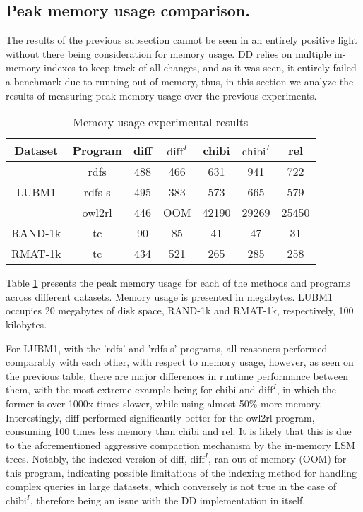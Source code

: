 \documentclass[sigconf,screen,review=false,natbib]{acmart}
\theoremstyle{definition}
\begin{document}
\subsection{Peak memory usage comparison.}
The results of the previous subsection cannot be seen in an entirely positive light without there being consideration for memory usage. DD relies on multiple
in-memory indexes to keep track of all changes, and as it was seen, it entirely failed a benchmark due to running out of memory, thus, in this section we analyze the results of
measuring peak memory usage over the previous experiments.
\begin{table}
	\caption{Memory usage experimental results}
	\begin{center}
		\begin{tabular}{|c|c|c|c|c|c|c|}
			\hline
			Dataset                & Program & diff & $\text{diff}^{I}$ & chibi & $\text{chibi}^{I}$ & rel   \\
			\hline
			\multirow{3}{*}{LUBM1} & rdfs    & 488  & 466               & 631   & 941                & 722   \\
			                       & rdfs-s  & 495  & 383               & 573   & 665                & 579   \\
			                       & owl2rl  & 446  & OOM               & 42190 & 29269              & 25450 \\
			\cline{2-7}
			\hline
			RAND-1k                & tc      & 90   & 85                & 41    & 47                 & 31    \\
			\hline
			RMAT-1k                & tc      & 434  & 521               & 265   & 285                & 258   \\
			\hline
		\end{tabular}
	\end{center}
	\label{tab:memorybenchmark}
\end{table}
Table \ref{tab:memorybenchmark} presents the peak memory usage for each of the methods and programs across different datasets. Memory usage is presented in megabytes. LUBM1
occupies 20 megabytes of disk space, RAND-1k and RMAT-1k, respectively, 100 kilobytes.

For LUBM1, with the 'rdfs' and 'rdfs-s' programs, all reasoners performed comparably with each other, with respect to memory usage, however, as seen on the previous table,
there are major differences in runtime performance between them, with the most extreme example being for chibi and $\text{diff}^{I}$, in which the former is over 1000x times
slower, while using almost 50\% more memory. Interestingly, diff performed significantly better for the owl2rl program, consuming 100 times less memory than chibi and rel. It
is likely that this is due to the aforementioned aggressive compaction mechanism by the in-memory LSM trees. Notably, the indexed version of diff, $\text{diff}^{I}$, ran out of
memory (OOM) for this program, indicating possible limitations of the indexing method for handling complex queries in large datasets, which conversely is not true in the case
of $\text{chibi}^{I}$, therefore being an issue with the DD implementation in itself.
\end{document}
